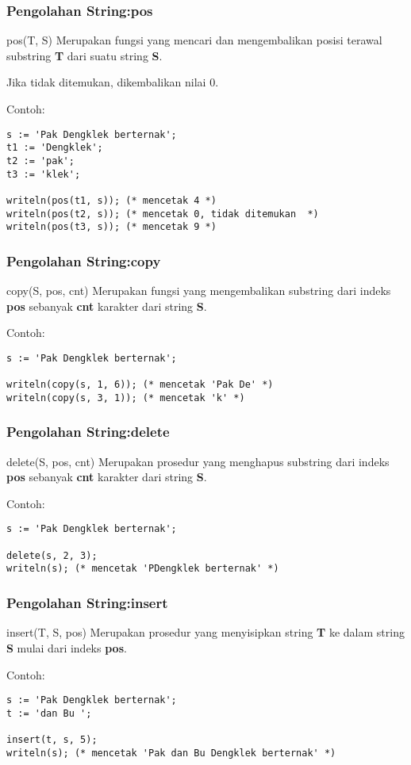 \documentclass{beamer}
\begin{document}
\begin{frame}[fragile]
\frametitle{Pengolahan String:\newline pos}
\begin{block}{pos(T, S)}
Merupakan fungsi yang mencari dan mengembalikan posisi terawal substring \textbf{T} dari suatu string \textbf{S}.

Jika tidak ditemukan, dikembalikan nilai 0.
\end{block}
Contoh:
\begin{lstlisting}
s := 'Pak Dengklek berternak';
t1 := 'Dengklek';
t2 := 'pak';
t3 := 'klek';

writeln(pos(t1, s)); (* mencetak 4 *)
writeln(pos(t2, s)); (* mencetak 0, tidak ditemukan  *)
writeln(pos(t3, s)); (* mencetak 9 *)
\end{lstlisting}
\end{frame}

\begin{frame}[fragile]
\frametitle{Pengolahan String:\newline copy}
\begin{block}{copy(S, pos, cnt)}
Merupakan fungsi yang mengembalikan substring dari indeks \textbf{pos} sebanyak \textbf{cnt} karakter dari string \textbf{S}.
\end{block}
Contoh:
\begin{lstlisting}
s := 'Pak Dengklek berternak';

writeln(copy(s, 1, 6)); (* mencetak 'Pak De' *)
writeln(copy(s, 3, 1)); (* mencetak 'k' *)
\end{lstlisting}
\end{frame}

\begin{frame}[fragile]
\frametitle{Pengolahan String:\newline delete}
\begin{block}{delete(S, pos, cnt)}
Merupakan prosedur yang menghapus substring dari indeks \textbf{pos} sebanyak \textbf{cnt} karakter dari string \textbf{S}.
\end{block}
Contoh:
\begin{lstlisting}
s := 'Pak Dengklek berternak';

delete(s, 2, 3);
writeln(s); (* mencetak 'PDengklek berternak' *)
\end{lstlisting}
\end{frame}

\begin{frame}[fragile]
\frametitle{Pengolahan String:\newline insert}
\begin{block}{insert(T, S, pos)}
Merupakan prosedur yang menyisipkan string \textbf{T} ke dalam string \textbf{S} mulai dari indeks \textbf{pos}.
\end{block}
Contoh:
\begin{lstlisting}
s := 'Pak Dengklek berternak';
t := 'dan Bu ';

insert(t, s, 5);
writeln(s); (* mencetak 'Pak dan Bu Dengklek berternak' *)
\end{lstlisting}
\end{frame}
\end{document}
